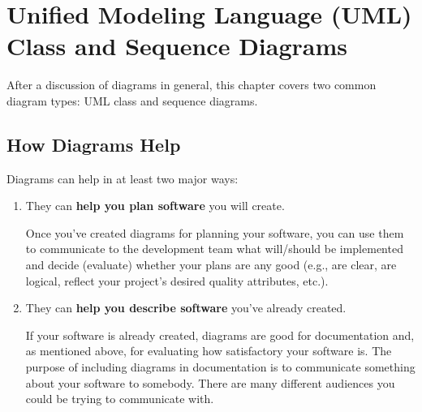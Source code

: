 \yesmargins
\chapter{Unified Modeling Language (UML) Class and Sequence Diagrams}



After a discussion of diagrams in general, this chapter covers two common diagram types: UML class and sequence diagrams.

\section{How Diagrams Help}

Diagrams can help in at least two major ways:

\begin{enumerate}
\item {
They can \textbf{help you plan software} you will create.

Once you've created diagrams for planning your software, you can use them to communicate to the development team what will/should be implemented and decide (evaluate) whether your plans are any good (e.g., are clear, are logical, reflect your project's desired quality attributes, etc.).
}
\item {
They can \textbf{help you describe software} you've already created.

\marginpar{\classDiagramDef\margindivider}\marginpar{\sequenceDiagramDef\margindivider}If your software is already created, diagrams are good for documentation and, as mentioned above, for evaluating how satisfactory your software is.  The purpose of including diagrams in documentation is to communicate something about your software to somebody. There are many different audiences you could be trying to communicate with.
}
\end{enumerate}

